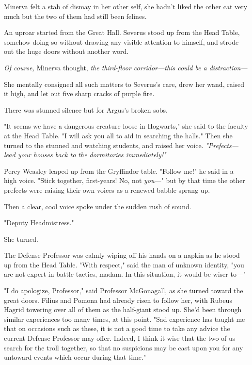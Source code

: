 Minerva felt a stab of dismay in her other self, she hadn't liked the other cat very much but the two of them had still been felines.

An uproar started from the Great Hall. Severus stood up from the Head Table, somehow doing so without drawing any visible attention to himself, and strode out the huge doors without another word.

\emph{Of course,} Minerva thought, \emph{the third-floor corridor---this could be a distraction---}

She mentally consigned all such matters to Severus's care, drew her wand, raised it high, and let out five sharp cracks of purple fire.

There was stunned silence but for Argus's broken sobs.

"It seems we have a dangerous creature loose in Hogwarts," she said to the faculty at the Head Table. "I will ask you all to aid in searching the halls." Then she turned to the stunned and watching students, and raised her voice. \emph{"Prefects---lead your houses back to the dormitories immediately!"}

Percy Weasley leaped up from the Gryffindor table. "Follow me!" he said in a high voice. "Stick together, first-years! No, not \emph{you}---" but by that time the other prefects were raising their own voices as a renewed babble sprang up.

Then a clear, cool voice spoke under the sudden rush of sound.

"Deputy Headmistress."

She turned.

The Defense Professor was calmly wiping off his hands on a napkin as he stood up from the Head Table. "With respect," said the man of unknown identity, "you are not expert in battle tactics, madam. In this situation, it would be wiser to---"

"I do apologize, Professor," said Professor McGonagall, as she turned toward the great doors. Filius and Pomona had already risen to follow her, with Rubeus Hagrid towering over all of them as the half-giant stood up. She'd been through similar experiences too many times, at this point. "Sad experience has taught me that on occasions such as these, it is not a good time to take any advice the current Defense Professor may offer. Indeed, I think it wise that the two of us search for the troll together, so that no suspicions may be cast upon you for any untoward events which occur during that time."

